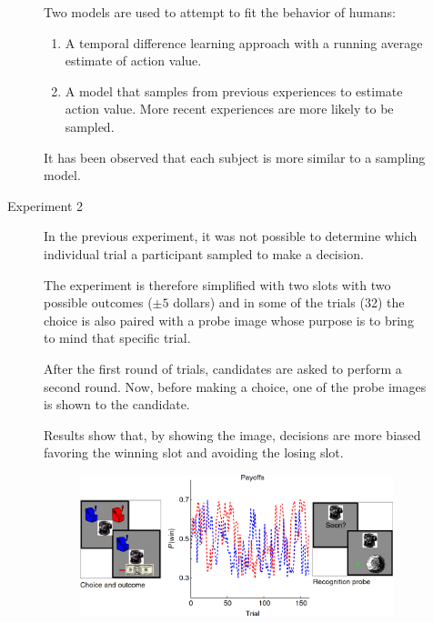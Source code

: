 \begin{description}
\begin{casestudy}
\begin{description}
                    Two models are used to attempt to fit the behavior of humans:
                    \begin{enumerate}
                        \item A temporal difference learning approach with a running average estimate of action value.
                        \item A model that samples from previous experiences to estimate action value. More recent experiences are more likely to be sampled.
                    \end{enumerate}
                    It has been observed that each subject is more similar to a sampling model.

                \item[Experiment 2]
                    In the previous experiment, it was not possible to determine which individual trial a participant sampled to make a decision.

                    The experiment is therefore simplified with two slots with two possible outcomes ($\pm 5$ dollars) and in some of the trials (32) the choice is also paired with a probe image whose purpose is to bring to mind that specific trial.

                    After the first round of trials, candidates are asked to perform a second round. Now, before making a choice, one of the probe images is shown to the candidate.
                    
                    Results show that, by showing the image, decisions are more biased favoring the winning slot and avoiding the losing slot.

                    \begin{figure}[H]
                        \centering
                        \includegraphics[width=0.6\linewidth]{./img/memory_decision2.png}
                    \end{figure}
            \end{description}
        \end{casestudy}
\end{description}



